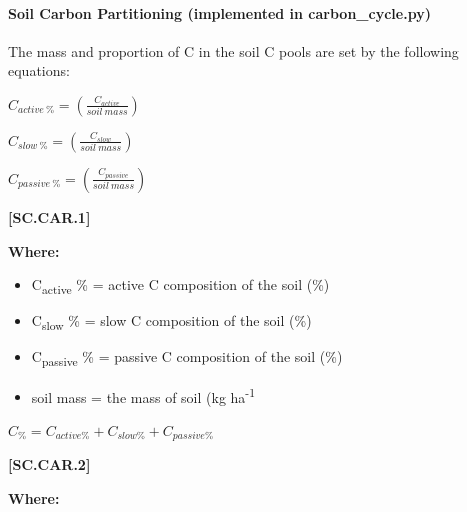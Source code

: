 \paragraph{Soil Carbon Partitioning (implemented in carbon\_cycle.py)} The mass and proportion of C in the soil C pools are set by the following equations:
        \vspace{0.5cm}

    \begin{center}
\(C_{active\ \%}=(\frac{C_{active}}{soil\ mass})\)
\vspace{0.1cm}

\(C_{slow\ \%}=(\frac{C_{slow}}{soil\ mass})\)
\vspace{0.1cm}

\(C_{passive\ \%}=(\frac{C_{passive}}{soil\ mass})\)

    \end{center}
        \vspace{0.5cm} 
    
            {\raggedleft \textbf{[SC.CAR.1]}\par}
            \vspace{0.5cm}

        \textbf{Where:}
            
        \begin{itemize}
            \item C\textsubscript{active} \%	=	active C composition of the soil (\%)
            \item C\textsubscript{slow}  \%	=	slow C composition of the soil (\%)
            \item C\textsubscript{passive}  \% = 	passive C composition of the soil (\%)
            \item soil mass = the mass of soil (kg ha\textsuperscript{-1}
        \end{itemize}
        \vspace{0.5cm}

    \begin{center}
\(C_\%=C_{active\%}+C_{slow\%}+C_{passive\%}	\)

    \end{center}
        \vspace{0.5cm} 
    
            {\raggedleft \textbf{[SC.CAR.2]}\par}
            \vspace{0.5cm}

        \textbf{Where:}
            
